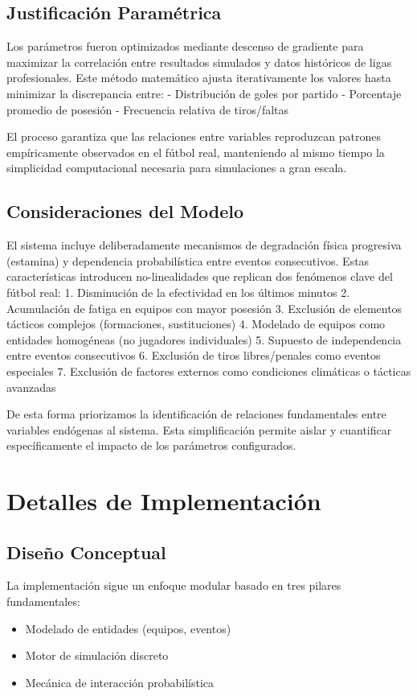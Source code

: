 \documentclass{article}
\begin{document}
\subsection{Justificación Paramétrica}
Los parámetros fueron optimizados mediante descenso de gradiente para maximizar la correlación entre resultados simulados y datos históricos de ligas profesionales. Este método matemático ajusta iterativamente los valores hasta minimizar la discrepancia entre:
- Distribución de goles por partido
- Porcentaje promedio de posesión
- Frecuencia relativa de tiros/faltas

El proceso garantiza que las relaciones entre variables reproduzcan patrones empíricamente observados en el fútbol real, manteniendo al mismo tiempo la simplicidad computacional necesaria para simulaciones a gran escala.

\subsection{Consideraciones del Modelo}
El sistema incluye deliberadamente mecanismos de degradación física progresiva (estamina) y dependencia probabilística entre eventos consecutivos. Estas características introducen no-linealidades que replican dos fenómenos clave del fútbol real:
1. Disminución de la efectividad en los últimos minutos
2. Acumulación de fatiga en equipos con mayor posesión
3. Exclusión de elementos tácticos complejos (formaciones, sustituciones)
4. Modelado de equipos como entidades homogéneas (no jugadores individuales)
5. Supuesto de independencia entre eventos consecutivos
6. Exclusión de tiros libres/penales como eventos especiales
7. Exclusión de factores externos como condiciones climáticas o tácticas avanzadas

De esta forma priorizamos la identificación de relaciones fundamentales entre variables endógenas al sistema. Esta simplificación permite aislar y cuantificar específicamente el impacto de los parámetros configurados.

\section{Detalles de Implementación}

\subsection{Diseño Conceptual}
La implementación sigue un enfoque modular basado en tres pilares fundamentales:
\begin{itemize}
    \item Modelado de entidades (equipos, eventos)
    \item Motor de simulación discreto
    \item Mecánica de interacción probabilística
\end{itemize}
\end{document}
